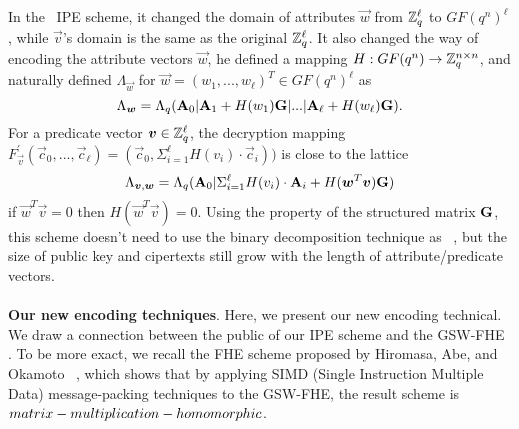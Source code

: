 In the~\cite{PKC:Xagawa13} IPE scheme, it changed the domain of attributes $\vec{w}$ from $\mathbb{Z}^{\ell}_{q}$ to $GF(q^{n})^{\ell}$, while $\vec{v}$'s domain is the same as the original $\mathbb{Z}^{\ell}_{q}$. It also changed the way of encoding the attribute vectors $\vec{w}$, he defined a mapping $H: GF(q^{n})\rightarrow \mathbb{Z}^{n\times n}_{q}$, and naturally defined $\Lambda_{\vec{w}}$ for $\vec{w}=(w_{1},...,w_{\ell})^{T}\in GF(q^{n})^{\ell}$ as
$$ \Lambda_{\boldsymbol{w}}=\Lambda_{q}(\mathbf{A}_{0}|\mathbf{A}_{1}+H(w_{1})\mathbf{G}|...|\mathbf{A}_{\ell}+H(w_{\ell})\mathbf{G}).$$
For a predicate vector $\boldsymbol{v}\in \mathbb{Z}^{\ell}_{q}$,  the decryption mapping $F^{'}_{\vec{v}}(\vec{c}_{0},...,\vec{c}_{\ell})=(\vec{c}_{0},\Sigma^{\ell}_{i=1}H(v_{i})\cdot \vec{c}_{i}))$ is close to the lattice
$$ \Lambda_{\boldsymbol{v},\boldsymbol{w}}=\Lambda_{q}(\mathbf{A}_{0}|\Sigma^{\ell}_{i=1}H(v_{i})\cdot \mathbf{A}_{i}+H(\boldsymbol{w}^{T}\boldsymbol{v})\mathbf{G}) $$
if $\vec{w}^{T}\vec{v}=0$ then $H(\vec{w}^{T}\vec{v})=0$. Using the property of the structured matrix $\mathbf{G}$, this scheme doesn't need to use the binary decomposition technique as ~\cite{AC:AgrFreVai11}, but the size of public key and cipertexts still grow with the length of attribute/predicate vectors.\\
\\
\textbf{Our new encoding techniques}. Here, we present our new encoding technical. We draw a connection between the public of our IPE scheme and the GSW-FHE~ \cite{C:GenSahWat13}. To be more exact, we recall the FHE scheme proposed by Hiromasa, Abe, and Okamoto~ \cite{PKC:HirAbeOka15}, which shows that by applying SIMD (Single Instruction Multiple Data) message-packing techniques to the GSW-FHE, the result scheme is $matrix-multiplication\\-homomorphic$.\

